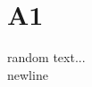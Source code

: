 \documentclass[a4paper]{article}
\begin{document}
\section{A1}

random text...\\
newline

\end{document}
